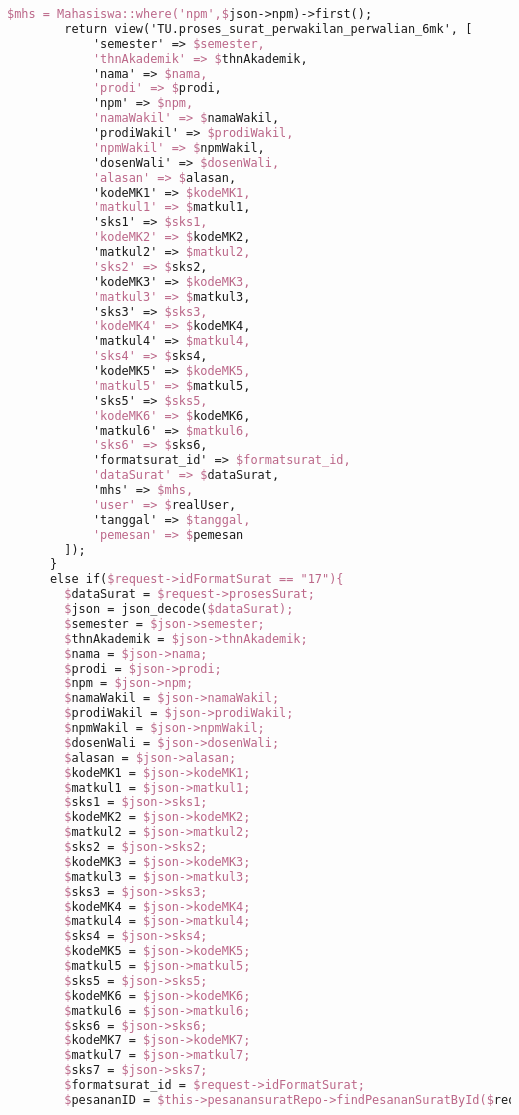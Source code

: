 \begin{lstlisting}[language=tex,basicstyle=\tiny,caption=PesanansuratController.php]
        $mhs = Mahasiswa::where('npm',$json->npm)->first();
        return view('TU.proses_surat_perwakilan_perwalian_6mk', [
            'semester' => $semester,
            'thnAkademik' => $thnAkademik,
            'nama' => $nama,
            'prodi' => $prodi,
            'npm' => $npm,
            'namaWakil' => $namaWakil,
            'prodiWakil' => $prodiWakil,
            'npmWakil' => $npmWakil,
            'dosenWali' => $dosenWali,
            'alasan' => $alasan,
            'kodeMK1' => $kodeMK1,
            'matkul1' => $matkul1,
            'sks1' => $sks1,
            'kodeMK2' => $kodeMK2,
            'matkul2' => $matkul2,
            'sks2' => $sks2,
            'kodeMK3' => $kodeMK3,
            'matkul3' => $matkul3,
            'sks3' => $sks3,
            'kodeMK4' => $kodeMK4,
            'matkul4' => $matkul4,
            'sks4' => $sks4,
            'kodeMK5' => $kodeMK5,
            'matkul5' => $matkul5,
            'sks5' => $sks5,
            'kodeMK6' => $kodeMK6,
            'matkul6' => $matkul6,
            'sks6' => $sks6,
            'formatsurat_id' => $formatsurat_id,
            'dataSurat' => $dataSurat,
            'mhs' => $mhs,
            'user' => $realUser,
            'tanggal' => $tanggal,
            'pemesan' => $pemesan
        ]);
      }
      else if($request->idFormatSurat == "17"){
        $dataSurat = $request->prosesSurat;
        $json = json_decode($dataSurat);
        $semester = $json->semester;
        $thnAkademik = $json->thnAkademik;
        $nama = $json->nama;
        $prodi = $json->prodi;
        $npm = $json->npm;
        $namaWakil = $json->namaWakil;
        $prodiWakil = $json->prodiWakil;
        $npmWakil = $json->npmWakil;
        $dosenWali = $json->dosenWali;
        $alasan = $json->alasan;
        $kodeMK1 = $json->kodeMK1;
        $matkul1 = $json->matkul1;
        $sks1 = $json->sks1;
        $kodeMK2 = $json->kodeMK2;
        $matkul2 = $json->matkul2;
        $sks2 = $json->sks2;
        $kodeMK3 = $json->kodeMK3;
        $matkul3 = $json->matkul3;
        $sks3 = $json->sks3;
        $kodeMK4 = $json->kodeMK4;
        $matkul4 = $json->matkul4;
        $sks4 = $json->sks4;
        $kodeMK5 = $json->kodeMK5;
        $matkul5 = $json->matkul5;
        $sks5 = $json->sks5;
        $kodeMK6 = $json->kodeMK6;
        $matkul6 = $json->matkul6;
        $sks6 = $json->sks6;
        $kodeMK7 = $json->kodeMK7;
        $matkul7 = $json->matkul7;
        $sks7 = $json->sks7;
        $formatsurat_id = $request->idFormatSurat;
        $pesananID = $this->pesanansuratRepo->findPesananSuratById($request->id);

\end{lstlisting}
